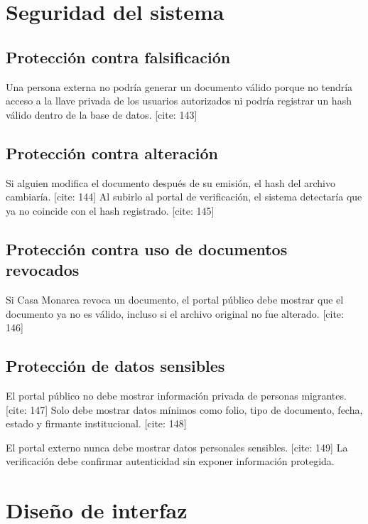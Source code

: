 \documentclass[10pt]{article} [cite: 1]
\begin{document}
\section{Seguridad del sistema}

\subsection{Protección contra falsificación}

Una persona externa no podría generar un documento válido porque no tendría acceso a la llave privada de los usuarios autorizados ni podría registrar un hash válido dentro de la base de datos. [cite: 143]

\subsection{Protección contra alteración}

Si alguien modifica el documento después de su emisión, el hash del archivo cambiaría. [cite: 144] Al subirlo al portal de verificación, el sistema detectaría que ya no coincide con el hash registrado. [cite: 145]

\subsection{Protección contra uso de documentos revocados}

Si Casa Monarca revoca un documento, el portal público debe mostrar que el documento ya no es válido, incluso si el archivo original no fue alterado. [cite: 146]

\subsection{Protección de datos sensibles}

El portal público no debe mostrar información privada de personas migrantes. [cite: 147] Solo debe mostrar datos mínimos como folio, tipo de documento, fecha, estado y firmante institucional. [cite: 148]

\begin{warningbox}
El portal externo nunca debe mostrar datos personales sensibles. [cite: 149] La verificación debe confirmar autenticidad sin exponer información protegida.
\end{warningbox}

\section{Diseño de interfaz}
\end{document}

